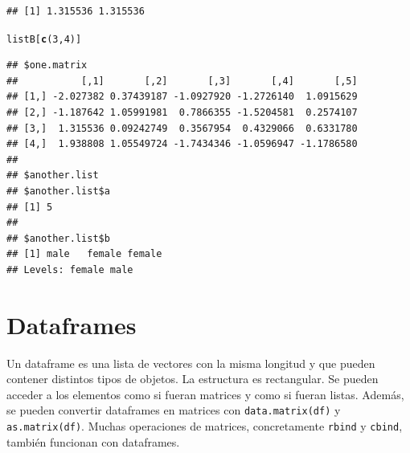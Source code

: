\documentclass{config/apuntes}\usepackage[]{graphicx}\usepackage[]{xcolor}
\makeatletter
\newcommand{\hlnum}[1]{\textcolor[rgb]{0.686,0.059,0.569}{#1}}%
\newcommand{\hldef}[1]{\textcolor[rgb]{0.345,0.345,0.345}{#1}}%
\newcommand{\hlkwd}[1]{\textcolor[rgb]{0.737,0.353,0.396}{\textbf{#1}}}%
\newenvironment{kframe}{%
 \def\at@end@of@kframe{}%
 \ifinner\ifhmode%
  \def\at@end@of@kframe{\end{minipage}}%
  \begin{minipage}{\columnwidth}%
 \fi\fi%
 \def\FrameCommand##1{\hskip\@totalleftmargin \hskip-\fboxsep
 \colorbox{shadecolor}{##1}\hskip-\fboxsep
     \hskip-\linewidth \hskip-\@totalleftmargin \hskip\columnwidth}%
 \MakeFramed {\advance\hsize-\width
   \@totalleftmargin\z@ \linewidth\hsize
   \@setminipage}}%
 {\par\unskip\endMakeFramed%
 \at@end@of@kframe}
\newenvironment{knitrout}{}{} %
\newcommand{\code}[1]{\texttt{#1}}
\makeatother
\begin{document}
\begin{knitrout}
\begin{kframe}
\begin{alltt}
\end{alltt}
\begin{verbatim}
## [1] 1.315536 1.315536
\end{verbatim}
\begin{alltt}
\hldef{listB[}\hlkwd{c}\hldef{(}\hlnum{3}\hldef{,} \hlnum{4}\hldef{)]}
\end{alltt}
\begin{verbatim}
## $one.matrix
##           [,1]       [,2]       [,3]       [,4]       [,5]
## [1,] -2.027382 0.37439187 -1.0927920 -1.2726140  1.0915629
## [2,] -1.187642 1.05991981  0.7866355 -1.5204581  0.2574107
## [3,]  1.315536 0.09242749  0.3567954  0.4329066  0.6331780
## [4,]  1.938808 1.05549724 -1.7434346 -1.0596947 -1.1786580
## 
## $another.list
## $another.list$a
## [1] 5
## 
## $another.list$b
## [1] male   female female
## Levels: female male
\end{verbatim}
\end{kframe}
\end{knitrout}

\section{Dataframes}
Un dataframe es una lista de vectores con la misma longitud y que pueden contener distintos tipos de objetos. La estructura es rectangular. Se pueden acceder a los elementos como si fueran matrices y como si fueran listas. Además, se pueden convertir dataframes en matrices con \code{data.matrix(df)} y \code{as.matrix(df)}. Muchas operaciones de matrices, concretamente \code{rbind} y \code{cbind}, también funcionan con dataframes.
\end{document}

